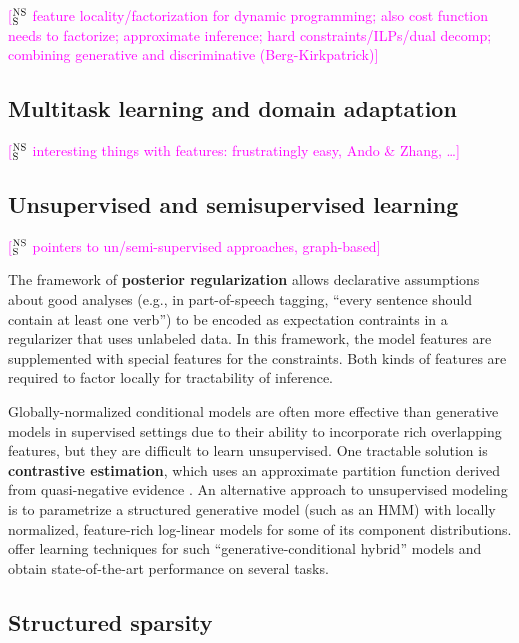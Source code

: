 \documentclass[11pt,letterpaper]{article}
\newcommand{\ensuretext}[1]{#1}
\newcommand{\nssmarker}{\ensuretext{\textcolor{magenta}{\ensuremath{^{\textsc{NS}}_{\textsc{S}}}}}}
\newcommand{\arkcomment}[3]{\ensuretext{\textcolor{#3}{[#1 #2]}}}
\newcommand{\nss}[1]{\arkcomment{\nssmarker}{#1}{magenta}}
\begin{document}
\nss{feature locality/factorization for dynamic programming; also cost function needs to factorize; 
approximate inference; hard constraints/ILPs/dual decomp; combining generative and discriminative (Berg-Kirkpatrick)}

\subsection{Multitask learning and domain adaptation}

\nss{interesting things with features: frustratingly easy, Ando \& Zhang, \ldots}

\subsection{Unsupervised and semisupervised learning}

\nss{pointers to un/semi-supervised approaches, graph-based}

The framework of \textbf{posterior regularization} \citep{ganchev-10} 
allows declarative assumptions about good analyses (e.g., in part-of-speech tagging, ``every sentence should contain at least one verb'') 
to be encoded as expectation contraints in a regularizer that uses unlabeled data.
In this framework, the model features are supplemented with special features for the constraints.
Both kinds of features are required to factor locally for tractability of inference.

Globally-normalized conditional models are often more effective than generative models in supervised settings 
due to their ability to incorporate rich overlapping features, but they are difficult to learn unsupervised.
One tractable solution is \textbf{contrastive estimation}, 
which uses an approximate partition function derived from quasi-negative evidence \citep{smith-05}. 
An alternative approach to unsupervised modeling is to parametrize a structured generative model (such as an HMM) 
with locally normalized, feature-rich log-linear models for some of its component distributions. 
\citet{berg-kirkpatrick-10} offer learning techniques for such ``generative-conditional hybrid'' models 
and obtain state-of-the-art performance on several tasks.

\subsection{Structured sparsity}
\end{document}
